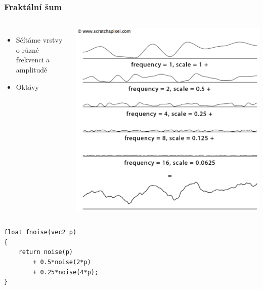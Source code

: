 \begin{frame}[fragile]
    \frametitle{Fraktální šum}
    \begin{columns}[c]
        \begin{itemize}
            \item Sčítáme vrstvy o různé frekvenci a amplitudě
            \item Oktávy
        \end{itemize}
        \includegraphics[width=\textwidth]{pics/procedural/1dnoise-fractal.eps}
    \end{columns}
  \begin{verbatim}
float fnoise(vec2 p)
{
    return noise(p)
        + 0.5*noise(2*p)
        + 0.25*noise(4*p);
}
  \end{verbatim}
\end{frame}

